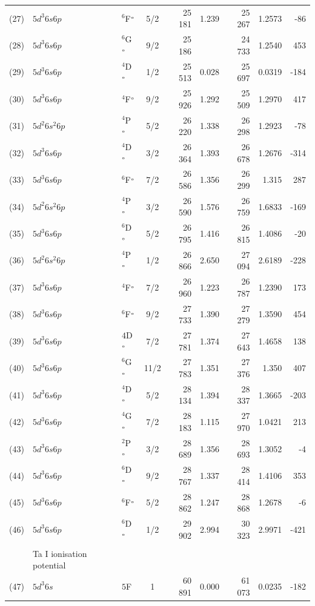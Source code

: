 \documentclass[10pt,a4paper, twoside]{report}
\begin{document}
\begin{table}[p!]
\begin{tabular}{cl@{\hspace{0.5cm}}l@{\hspace{0.5cm}}c@{\hspace{0.5cm}}r@{\hspace{0.5cm}}r@{\hspace{0.5cm}}r@{\hspace{0.5cm}}r@{\hspace{0.5cm}}r}
(27)  &$5d^3 6s 6p$ & $^6$F$^{\rm_o}$ & 5/2 & 25 181 & 1.239 & 25 267 & 1.2573 & -86 \\
(28)  &$5d^3 6s 6p$ & $^6$G$^{\rm_o}$ & 9/2 & 25 186 &  & 24 733  & 1.2540 & 453 \\
(29)  &$5d^3 6s 6p$ & $^4$D$^{\rm_o}$ & 1/2 & 25 513 & 0.028 & 25 697 & 0.0319  & -184 \\
(30)  &$5d^3 6s 6p$ & $^4$F$^{\rm_o}$  & 9/2 & 25 926 &  1.292 & 25 509 & 1.2970 & 417 \\
(31)  &$5d^2 6s^2 6p$ & $^4$P$^{\rm_o}$ & 5/2 & 26 220 & 1.338 & 26 298 & 1.2923 & -78 \\
(32)  &$5d^3 6s 6p$ & $^4$D$^{\rm_o}$ & 3/2 & 26 364 & 1.393 & 26 678 & 1.2676 & -314 \\
(33)  &$5d^3 6s 6p$ & $^6$F$^{\rm_o}$  & 7/2 & 26 586 & 1.356  & 26 299 & 1.315 & 287 \\
(34)  &$5d^2 6s^2 6p$ & $^4$P$^{\rm_o}$ & 3/2 & 26 590 & 1.576 & 26 759 & 1.6833 & -169\\
(35)  &$5d^3 6s 6p$ & $^6$D$^{\rm_o}$ & 5/2 & 26 795 & 1.416 & 26 815 & 1.4086 & -20 \\
(36)  &$5d^2 6s^2 6p$ & $^4$P$^{\rm_o}$ & 1/2 & 26 866 & 2.650 & 27 094 & 2.6189 & -228\\
(37)  &$5d^3 6s 6p$ &  $^4$F$^{\rm_o}$   & 7/2 & 26 960 & 1.223  & 26 787 & 1.2390 & 173 \\
(38)  &$5d^3 6s 6p$ & $^6$F$^{\rm_o}$  & 9/2 & 27 733 &  1.390 & 27 279 & 1.3590 & 454 \\
(39)  &$5d^3 6s 6p$ & $4$D$^{\rm_o}$   & 7/2 & 27 781 & 1.374  & 27 643 & 1.4658 & 138 \\
(40)  &$5d^3 6s 6p$ & $^6$G$^{\rm_o}$ & 11/2 & 27 783 & 1.351 &  27 376 & 1.350  & 407\\
(41)  &$5d^3 6s 6p$ & $^4$D$^{\rm_o}$ & 5/2 & 28 134 & 1.394 & 28 337 & 1.3665 & -203 \\
(42)  &$5d^3 6s 6p$ & $^4$G$^{\rm_o}$   & 7/2 & 28 183 & 1.115  & 27 970 & 1.0421 & 213 \\
(43) &$5d^3 6s 6p$ & $^2$P$^{\rm_o}$   & 3/2 & 28 689 & 1.356  & 28 693 & 1.3052  & -4 \\
(44)  &$5d^3 6s 6p$ & $^6$D$^{\rm_o}$  & 9/2 & 28 767 &  1.337 & 28 414 & 1.4106 & 353 \\
(45)  &$5d^3 6s 6p$ & $^6$F$^{\rm_o}$ & 5/2 & 28 862 & 1.247 & 28 868 & 1.2678 & -6 \\
(46)  &$5d^3 6s 6p$ & $^6$D$^{\rm_o}$ & 1/2 & 29 902 & 2.994 & 30 323 & 2.9971 & -421 \\
\\
& Ta I ionisation potential \\
(47)  &$5d^3 6s$& $5$F & 1 & 60 891 & 0.000 & 61 073 &    0.0235 &  -182\\
\bottomrule
\bottomrule
\end{tabular}
\end{table}
\end{document}
